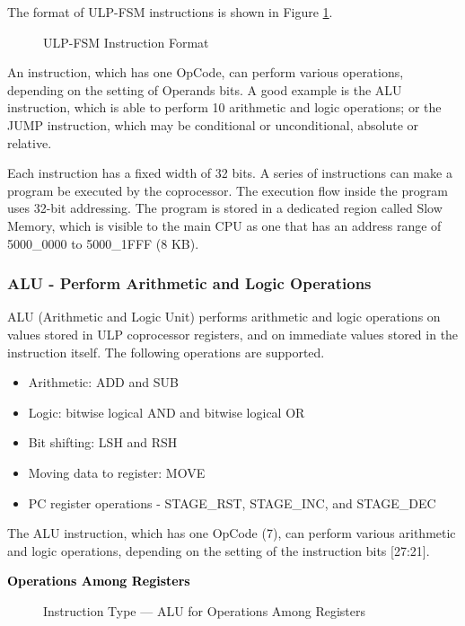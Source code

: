 \documentclass[main\_\_EN.tex]{subfiles}
\begin{document}
The format of ULP-FSM instructions is shown in Figure \ref{figure:ULP-instruction}.

%
%
\begin{figure}[!ht ]
    \centering
    \caption{ULP-FSM Instruction Format}
    \label{figure:ULP-instruction}
\end{figure}

An instruction, which has one OpCode, can perform various operations, depending on the setting of Operands bits. A good example is the ALU instruction, which is able to perform 10 arithmetic and logic operations; or the JUMP instruction, which may be conditional or unconditional, absolute or relative.

Each instruction has a fixed width of 32 bits. A series of instructions can make a program be executed by the coprocessor. The execution flow inside the program uses 32-bit addressing. The program is stored in a dedicated region called Slow Memory, which is visible to the main CPU as one that has an address range of \hexprefix{}5000\_0000 to \hexprefix{}5000\_1FFF (8 KB).

\subsubsection{ALU - Perform Arithmetic and Logic Operations}

ALU (Arithmetic and Logic Unit) performs arithmetic and logic operations on values stored in ULP coprocessor registers, and on immediate values stored in the instruction itself. The following operations are supported.
\begin{itemize}
    \item Arithmetic: ADD and SUB
    \item Logic: bitwise logical AND and bitwise logical OR
    \item Bit shifting: LSH and RSH
    \item Moving data to register: MOVE
    \item PC register operations - STAGE\_RST, STAGE\_INC, and STAGE\_DEC
\end{itemize}

The ALU instruction, which has one OpCode (7), can perform various arithmetic and logic operations, depending on the setting of the instruction bits [27:21].

\textcolor{black}{\bfseries Operations Among Registers}

%
%
%
%
%
%
%
%
\begin{figure}[!ht ]
    \centering
    \caption{Instruction Type — ALU for Operations Among Registers}
    \label{figure:ALU-among-registers}
\end{figure}
\end{document}

